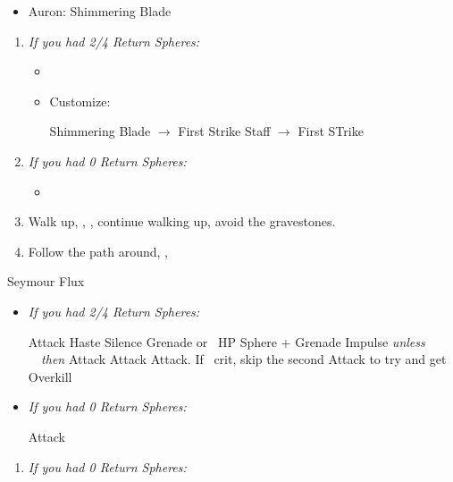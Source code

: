 \begin{multicols}{2}
\begin{equip}
\begin{itemize}
	\item Auron: Shimmering Blade
\end{itemize}
\end{equip}
\begin{enumerate}[resume]
	\item \textit{If you had 2/4 Return Spheres:}
	\begin{itemize}
		\item \formation{\tidus}{\yuna}{\auron} 
		\item Customize:
		\begin{itemize}
			\auronf Shimmering Blade $\rightarrow$ First Strike
			\yunaf Staff $\rightarrow$ First STrike
		\end{itemize}
	\end{itemize}
	\item \textit{If you had 0 Return Spheres:}
	\begin{itemize}
		\item \formation{\tidus}{\kimahri}{\auron}
	\end{itemize}
	\item Walk up, \sd, \cs[1:20], continue walking up, avoid the gravestones.
	\item Follow the path around, \save, \sd
\end{enumerate}
\vfill
\begin{battle}[70000]{Seymour Flux}
\begin{itemize}
	\item \textit{If you had 2/4 Return Spheres:}
	\begin{itemize}
		\yunaf Attack
		\tidusf Haste \yuna
		\switch{\auron}{\rikku}
		\rikkuf Silence Grenade or \od\ HP Sphere + Grenade
		\summon{\bahamut}
		\bahamutf Impulse \textit{unless \rikku\ \od\ then } Attack
		\yunaf Attack
		\tidusf Attack. If \yuna\ crit, skip the second Attack to try and get Overkill
	\end{itemize}
	\item \textit{If you had 0 Return Spheres:}
	\begin{itemize}
		\switch{\tidus}{\yuna}
		\summon{\bahamut}
		\bahamutf Attack
	\end{itemize}
\end{itemize}
\end{battle}
\begin{enumerate}
	\item \textit{If you had 0 Return Spheres:} \formation{\tidus}{\kimahri}{\auron}

\end{enumerate}
\end{multicols}
